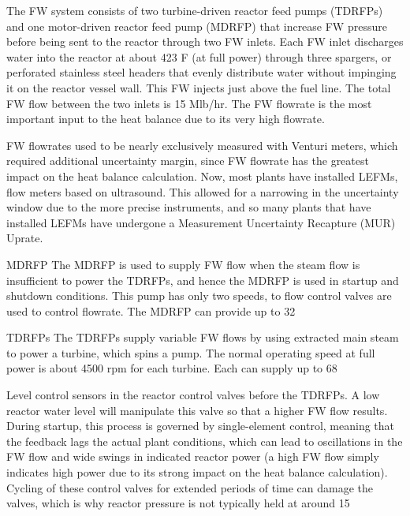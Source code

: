 \documentclass[10pt]{article}
\begin{document}
The FW system consists of two turbine-driven reactor feed pumps (TDRFPs) and one motor-driven reactor feed pump (MDRFP) that increase FW pressure before being sent to the reactor through two FW inlets. Each FW inlet discharges water into the reactor at about 423 F (at full power) through three spargers, or perforated stainless steel headers that evenly distribute water without impinging it on the reactor vessel wall. This FW injects just above the fuel line. The total FW flow between the two inlets is 15 Mlb/hr. The FW flowrate is the most important input to the heat balance due to its very high flowrate.

FW flowrates used to be nearly exclusively measured with Venturi meters, which required additional uncertainty margin, since FW flowrate has the greatest impact on the heat balance calculation. Now, most plants have installed LEFMs, flow meters based on ultrasound. This allowed for a narrowing in the uncertainty window due to the more precise instruments, and so many plants that have installed LEFMs have undergone a Measurement Uncertainty Recapture (MUR) Uprate. 

MDRFP
The MDRFP is used to supply FW flow when the steam flow is insufficient to power the TDRFPs, and hence the MDRFP is used in startup and shutdown conditions. This pump has only two speeds, to flow control valves are used to control flowrate. The MDRFP can provide up to 32%

TDRFPs
The TDRFPs supply variable FW flows by using extracted main steam to power a turbine, which spins a pump. The normal operating speed at full power is about 4500 rpm for each turbine. Each can supply up to 68%

Level control sensors in the reactor control valves before the TDRFPs. A low reactor water level will manipulate this valve so that a higher FW flow results. During startup, this process is governed by single-element control, meaning that the feedback lags the actual plant conditions, which can lead to oscillations in the FW flow and wide swings in indicated reactor power (a high FW flow simply indicates high power due to its strong impact on the heat balance calculation). Cycling of these control valves for extended periods of time can damage the valves, which is why reactor pressure is not typically held at around 15%
\end{document}
